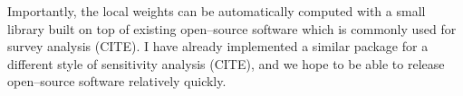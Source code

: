 Importantly, the local weights can be automatically computed with a small
library built on top of existing open--source software which is commonly used
for survey analysis (CITE).  I have already implemented a similar package for a
different style of sensitivity analysis (CITE), and we hope to be able to
release open--source software relatively quickly.  









\newpage





